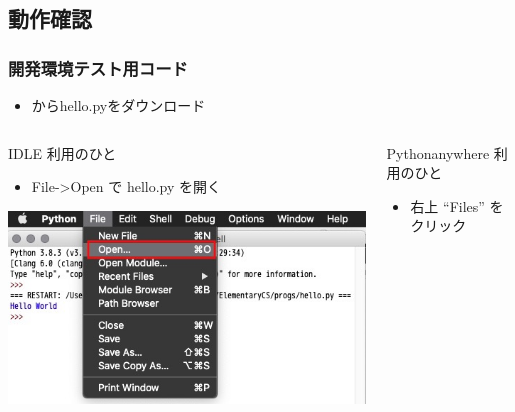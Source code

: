\subsection{動作確認}
\begin{frame}
\frametitle{開発環境テスト用コード}
  \begin{itemize}
\item \href{https://sites.google.com/presystems.xyz/elementarycs/top}{} 
からhello.pyをダウンロード
  \end{itemize}
\vspace{-1em}
  \begin{columns}[t]
    \begin{column}{0.5\textwidth}
      \begin{itembox}{\footnotesize IDLE 利用のひと}
        \begin{itemize}
\scriptsize
\item File->Open で hello.py を開く
        \end{itemize}
\includegraphics[width=1\textwidth]{./Figure/elementaryCS-figOpenFile.jpg}
      \end{itembox}
    \end{column}
    \begin{column}{0.5\textwidth}
      \begin{itembox}{\footnotesize Pythonanywhere 利用のひと}
\scriptsize
        \begin{itemize}
\item 右上 ``Files'' をクリック

\end{itemize}
\end{itembox}
\end{column}
\end{columns}
\end{frame}
